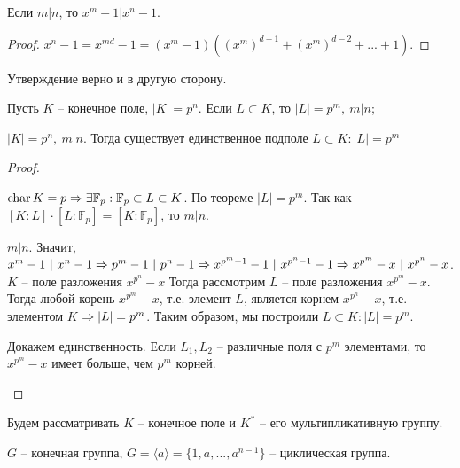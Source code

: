 \begin{Lm}
	Если $m | n$, то $x^m - 1 | x^n - 1$.
\end{Lm}

\begin{proof}
	$x^n - 1 = x^{md} - 1 = (x^m - 1)\left((x^m)^{d - 1} + (x^m)^{d - 2} + ... + 1\right)$. 
\end{proof}

\begin{Rem}
	Утверждение верно и в другую сторону.
\end{Rem}

\begin{Thm}
	\begin{MyList}
		\item Пусть $K$ -- конечное поле, $|K| = p^n$. Если $L \subset K$, то $|L| = p^m, \ m | n$;
		\item $|K| = p^n, \ m | n$. Тогда существует единственное подполе $L \subset K : |L| = p^m$
	\end{MyList}
\end{Thm}

\begin{proof}
	\begin{MyList}
		\item $\operatorname{char} K = p \Rightarrow \exists \mathbb{F}_p : \mathbb{F}_p \subset L \subset K$. По теореме $|L| = p^m$.
		Так как $[K:L] \cdot [L : \mathbb{F}_p] = [K : \mathbb{F}_p]$, то $m | n$. 

		\item $m | n$. Значит, $x^m - 1 \ | \ x^n - 1 \Rightarrow p^m - 1 \ | \ p^n - 1 \Rightarrow x^{p^m - 1} - 1 \ | \ x^{p^n - 1} - 1 \Rightarrow x^{p^m} - x \ | \ x^{p^n} - x$.
		$K$ -- поле разложения $x^{p^n} - x$ Тогда рассмотрим $L$ -- поле разложения $x^{p^m} - x$. Тогда любой корень $x^{p^m} - x$, т.е. элемент $L$, является корнем $x^{p^n} - x$, т.е. элементом $K$ $\Rightarrow |L| = p^m$. 
		Таким образом, мы построили $L \subset K : |L| = p^m$.
		
		Докажем единственность. Если $L_1, L_2$ -- различные поля с $p^m$ элементами, то $x^{p^m} - x$ имеет больше, чем $p^m$ корней.
	\end{MyList}
\end{proof}


Будем рассматривать $K$ -- конечное поле и $K^*$ -- его мультипликативную группу.

\begin{Def}
	$G$ -- конечная группа, $G = \langle a\rangle = \{1, a, ..., a^{n - 1}\}$ -- циклическая группа. 
\end{Def}

